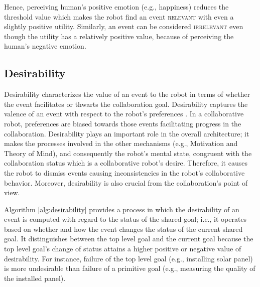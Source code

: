 Hence, perceiving human's positive emotion (e.g., happiness) reduces the
threshold value which makes the robot find an event \textsc{relevant} with even
a slightly positive utility. Similarly, an event can be considered
\textsc{irrelevant} even though the utility has a relatively positive value,
because of perceiving the human's negative emotion.

\subsection{Desirability}

Desirability characterizes the value of an event to the robot in terms of
whether the event facilitates or thwarts the collaboration goal. Desirability
captures the valence of an event with respect to the robot's preferences
\cite{gratch:domain-independent}. In a collaborative robot, preferences are
biased towards those events facilitating progress in the collaboration.
Desirability plays an important role in the overall architecture; it makes the
processes involved in the other mechanisms (e.g., Motivation and Theory of
Mind), and consequently the robot's mental state, congruent with the
collaboration status which is a collaborative robot's desire. Therefore, it
causes the robot to dismiss events causing inconsistencies in the robot's
collaborative behavior. Moreover, desirability is also crucial from the
collaboration's point of view.


Algorithm \ref{alg:desirability} provides a process in which the desirability of
an event is computed with regard to the status of the shared goal; i.e., it
operates based on whether and how the event changes the status of the current
shared goal. It distinguishes between the top level goal and the current goal
because the top level goal's change of status attains a higher positive or
negative value of desirability. For instance, failure of the top level goal
(e.g., installing solar panel) is more undesirable than failure of a primitive
goal (e.g., measuring the quality of the installed panel).

